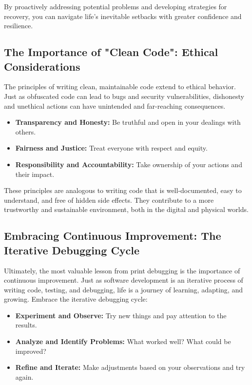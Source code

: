 \documentclass{article}
\begin{document}
{{{{By proactively addressing potential problems and developing strategies for recovery, you can navigate life's inevitable setbacks with greater confidence and resilience.

\subsection*{The Importance of "Clean Code": Ethical Considerations}

The principles of writing clean, maintainable code extend to ethical behavior. Just as obfuscated code can lead to bugs and security vulnerabilities, dishonesty and unethical actions can have unintended and far-reaching consequences.

\begin{itemize}
    \item \textbf{Transparency and Honesty:} Be truthful and open in your dealings with others.
    \item \textbf{Fairness and Justice:} Treat everyone with respect and equity.
    \item \textbf{Responsibility and Accountability:} Take ownership of your actions and their impact.
\end{itemize}

These principles are analogous to writing code that is well-documented, easy to understand, and free of hidden side effects. They contribute to a more trustworthy and sustainable environment, both in the digital and physical worlds.

\subsection*{Embracing Continuous Improvement: The Iterative Debugging Cycle}

Ultimately, the most valuable lesson from print debugging is the importance of continuous improvement. Just as software development is an iterative process of writing code, testing, and debugging, life is a journey of learning, adapting, and growing. Embrace the iterative debugging cycle:

\begin{itemize}
    \item \textbf{Experiment and Observe:} Try new things and pay attention to the results.
    \item \textbf{Analyze and Identify Problems:} What worked well? What could be improved?
    \item \textbf{Refine and Iterate:} Make adjustments based on your observations and try again.
\end{itemize}

}}}}
\end{document}
